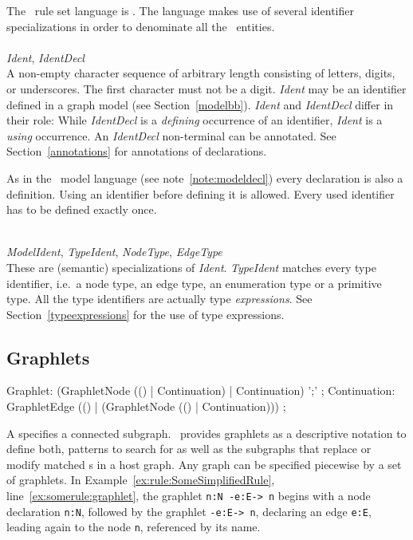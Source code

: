 The \GrG\ rule set language is . The language makes use of several identifier specializations in order to denominate all the \GrG\ entities.\\
\\
\emph{Ident}, \emph{IdentDecl}\\ \nopagebreak
A non-empty character sequence of arbitrary length consisting of letters, digits, or underscores. The first character must not be a digit.
\emph{Ident} may be an identifier defined in a graph model (see Section~\ref{modelbb}).
\emph{Ident} and \emph{IdentDecl} differ in their role: While \emph{IdentDecl} is a \emph{defining} occurrence of an identifier, \emph{Ident} is a \emph{using} occurrence.
An \emph{IdentDecl} non-terminal can be annotated. See Section~\ref{annotations} for annotations of declarations.
\begin{note}
  As in the \GrG\ model language (see note~\ref{note:modeldecl}) every declaration is also a definition. Using an identifier before defining it is allowed. Every used identifier has to be defined exactly once.
\end{note}
\mbox{ }\\
\emph{ModelIdent}, \emph{TypeIdent}, \emph{NodeType}, \emph{EdgeType}\\
These are (semantic) specializations of \emph{Ident}.
\emph{TypeIdent} matches every type identifier, i.e.\ a node type, an edge type, an enumeration type or a primitive type.
All the type identifiers are actually type \emph{expressions}.
See Section~\ref{typeexpressions} for the use of type expressions.\\

\subsection{Graphlets}
\label{sct:graphlets}
\begin{rail}
  Graphlet: (GraphletNode (() | Continuation) | Continuation) ';' ;
  Continuation: GraphletEdge (() | (GraphletNode (() | Continuation))) ;
\end{rail}
A  specifies a connected subgraph.
\GrG\ provides graphlets as a descriptive notation to define both, patterns to search for as well as the subgraphs that replace or modify matched s in a host graph.
Any graph can be specified piecewise by a set of graphlets.
In Example~\ref{ex:rule:SomeSimplifiedRule}, line~\ref{ex:somerule:graphlet}, the graphlet \texttt{n:N -e:E-> n} begins with a node declaration \texttt{n:N}, followed by the  graphlet \texttt{-e:E-> n}, declaring an edge \texttt{e:E}, leading again to the node \texttt{n}, referenced by its name.

